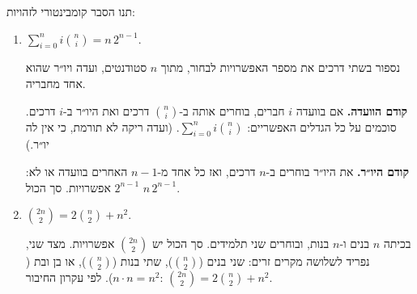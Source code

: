 תנו הסבר קומבינטורי לזהויות:
\begin{enumerate}
\item $\displaystyle\sum_{i=0}^n i\binom ni=n\,2^{n-1}$.
\begin{solbox}
נספור בשתי דרכים את מספר האפשרויות לבחור, מתוך $n$ סטודנטים, ועדה ויו״ר שהוא אחד מחבריה.

\textbf{קודם הוועדה.} אם בוועדה $i$ חברים, בוחרים אותה ב-$\binom ni$ דרכים ואת היו״ר ב-$i$ דרכים. סוכמים על כל הגדלים האפשריים: $\sum_{i=0}^n i\binom ni$. (ועדה ריקה לא תורמת, כי אין לה יו״ר.)

\textbf{קודם היו״ר.} את היו״ר בוחרים ב-$n$ דרכים, ואז כל אחד מ-$n-1$ האחרים בוועדה או לא: $2^{n-1}$ אפשרויות. סך הכול $n\,2^{n-1}$.
\end{solbox}
\item $\displaystyle\binom{2n}2=2\binom n2+n^2$.
\begin{solbox}
בכיתה $n$ בנים ו-$n$ בנות, ובוחרים שני תלמידים. סך הכול יש $\binom{2n}2$ אפשרויות. מצד שני, נפריד לשלושה מקרים זרים: שני בנים ($\binom n2$), שתי בנות ($\binom n2$), או בן ובת ($n\cdot n=n^2$). לפי עקרון החיבור: $\binom{2n}2=2\binom n2+n^2$.
\end{solbox}
\end{enumerate}
